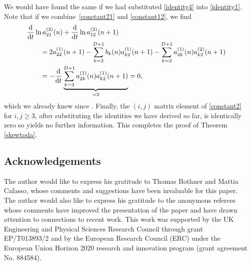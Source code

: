 \documentclass[pdftex]{sigma}
\numberwithin{equation}{section}
\begin{document}
We would have found the same if we had substituted \eqref{identity4} into \eqref{identity1}.
Note that if we combine~\eqref{constant21} and \eqref{constant12}, we find
\begin{align*}
 &\frac{\rm d}{{\rm d}t} \ln a_{21}^{(2)}(n) + \frac{\rm d}{{\rm d}t} \ln a_{12}^{(2)}(n+1) \\
& \qquad = 2 a_{22}^{(1)}(n+1) - \sum_{k=3}^{D+1} b_k(n) a_{k2}^{(1)}(n+1)
- \sum_{k=3}^{D+1} a_{2k}^{(1)}(n) a_{k2}^{(2)}(n+1) \\
&\qquad = - \frac{\rm d}{{\rm d}t}\underbrace{ \sum_{k=3}^{D+1} a_{2k}^{(1)}(n) a_{k2}^{(1)}(n+1)}_{=2} = 0,
\end{align*}
which we already knew since . Finally, the $(i,j)$ matrix element of \eqref{constant2} for $i,j \geq 3$, after substituting the identities we have derived so far, is identically zero so yields no further information. This completes the proof of Theorem \ref{skewtoda}.

\subsection*{Acknowledgements}

The author would like to express his gratitude to Thomas Bothner and Mattia Cafasso, whose comments and suggestions have been invaluable for this paper. The author would also like to express his gratitude to the anonymous referees whose comments have improved the presentation of the paper and have drawn attention to connections to recent work. This work was supported by the UK Engineering and Physical Sciences Research Council through grant EP/T013893/2 and by the European Research Council (ERC) under the European Union Horizon 2020 research and innovation program (grant agreement No. 884584).
\end{document}
